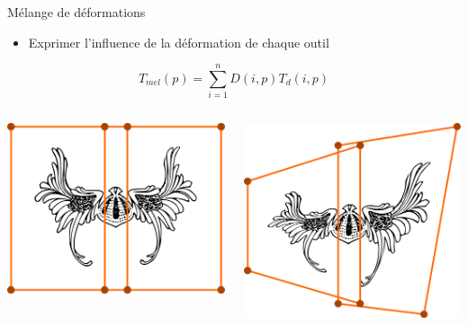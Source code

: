 \documentclass[xcolor=x11names,compress]{beamer}
\renewcommand{\(}{\begin{columns}} \renewcommand{\)}{\end{columns}}
\newcommand{\<}[1]{\begin{column}{#1}} \renewcommand{\>}{\end{column}}
\begin{document}
\begin{frame}{Mélange de déformations}
  \begin{itemize}
    \item Exprimer l'influence de la déformation de chaque outil
  \end{itemize}
  \begin{displaymath}
    T_{mel}(p) = \sum_{i=1}^n D(i, p) T_{d}(i, p)
  \end{displaymath}
  \begin{columns}[t]
    \begin{column}{0.5\textwidth}
      \centering
      \includegraphics[scale=0.13]{Deformation-Viking-Avant}
    \end{column}
    \begin{column}{0.5\textwidth}
      \centering
      \includegraphics[scale=0.13]{Deformation-Viking-Apres}
    \end{column}
  \end{columns}
\end{frame}
\end{document}
